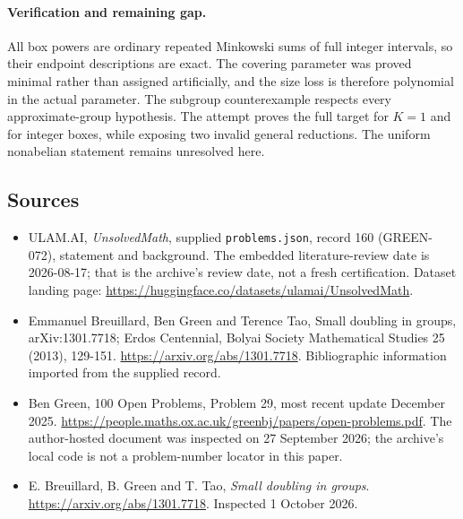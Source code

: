 \documentclass[11pt,a4paper]{article}
\begin{document}
\paragraph{Verification and remaining gap.}
All box powers are ordinary repeated Minkowski sums of full integer intervals, so their endpoint descriptions are exact. The covering parameter was proved minimal rather than assigned artificially, and the size loss is therefore polynomial in the actual parameter. The subgroup counterexample respects every approximate-group hypothesis. The attempt proves the full target for $K=1$ and for integer boxes, while exposing two invalid general reductions. The uniform nonabelian statement remains unresolved here.

\subsection{Sources}

{\small

\begin{itemize}

\item[\hypertarget{source:160:1}{S1}] ULAM.AI, \emph{UnsolvedMath}, supplied \texttt{problems.json}, record 160 (GREEN-072), statement and background. The embedded literature-review date is 2026-08-17; that is the archive’s review date, not a fresh certification. Dataset landing page: \url{https://huggingface.co/datasets/ulamai/UnsolvedMath}.

\item[\hypertarget{source:160:2}{S2}] Emmanuel Breuillard, Ben Green and Terence Tao, Small doubling in groups, arXiv:1301.7718; Erdos Centennial, Bolyai Society Mathematical Studies 25 (2013), 129-151. \url{https://arxiv.org/abs/1301.7718}. Bibliographic information imported from the supplied record.

\item[\hypertarget{source:160:3}{S3}] Ben Green, 100 Open Problems, Problem 29, most recent update December 2025. \url{https://people.maths.ox.ac.uk/greenbj/papers/open-problems.pdf}. The author-hosted document was inspected on 27 September 2026; the archive’s local code is not a problem-number locator in this paper.

\item[E1] E. Breuillard, B. Green and T. Tao, \emph{Small doubling in groups}. \url{https://arxiv.org/abs/1301.7718}. Inspected 1 October 2026.

\end{itemize}

}

\label{end:160}
\end{document}
